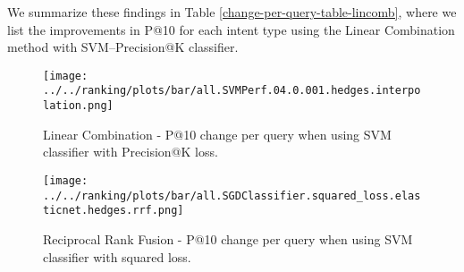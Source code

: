 We summarize these findings in Table \ref{change-per-query-table-lincomb},
where we list the improvements in P@10 for each intent type using the Linear Combination method with SVM--Precision@K
classifier.

\begin{table}[h!]
\centering
\caption{Absolute P@10 percent improvements per intent type for each of the four query runs
(Summaries 2014, Descriptions 2014, Summaries 2015, Descriptions 2015), when using weighted \textbf{Linear Combination}
for fusing the baseline relevance scores with the classifier scores.
The classifier is SVM with Precision@K loss.}
\label{change-per-query-table-lincomb}
\end{table}

\begin{figure}
\centerline{
  \texttt{[image: ../../ranking/plots/bar/all.SVMPerf.04.0.001.hedges.interpolation.png]}
  }
  \caption{Linear Combination - P@10 change per query when using SVM classifier with Precision@K loss.}
  \label{interp-query}
\end{figure}

\begin{figure}
\centerline{
  \texttt{[image: ../../ranking/plots/bar/all.SGDClassifier.squared\_loss.elasticnet.hedges.rrf.png]}
  }
  \caption{Reciprocal Rank Fusion - P@10 change per query when using SVM classifier with squared loss.}
  \label{rrf-query}
\end{figure}

